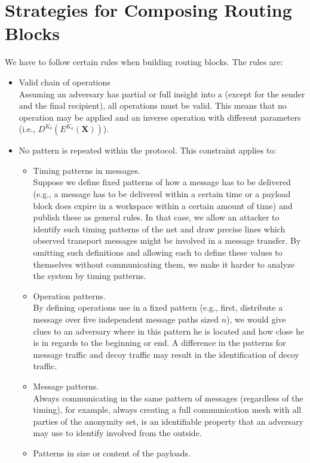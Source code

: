 \section{Strategies for Composing Routing Blocks}\label{sec:routingStrategies}
We have to follow certain rules when building routing blocks. The rules are:
\begin{itemize}
	\item Valid chain of operations\\
	Assuming an adversary has partial or full insight into a  (except for the sender and the final recipient), all operations must be valid. This means that no operation may be applied and an inverse operation with different parameters  (i.e., $D^{K_b}\left(E^{K_a}\left(\textbf{X}\right)\right)$).
	\item No pattern is repeated within the protocol. This constraint applies to:
	\begin{itemize}
		\item Timing patterns in messages.\\
		Suppose we define fixed patterns of how a message has to be delivered (e.g., a message has to be delivered within a certain time or a payload block does expire in a workspace within a certain amount of time) and publish these as general rules. In that case, we allow an attacker to identify such timing patterns of the net and draw precise lines which observed transport messages might be involved in a message transfer. By omitting such definitions and allowing each  to define these values to themselves without communicating them, we make it harder to analyze the system by timing patterns.
		\item Operation patterns.\\
		By defining operations use in a fixed pattern (e.g., first, distribute a message over five independent message paths sized $n$), we would give clues to an adversary where in this pattern he is located and how close he is in regards to the beginning or end. A difference in the patterns for message traffic and decoy traffic may result in the identification of decoy traffic.
		\item Message patterns.\\
		Always communicating in the same pattern of messages (regardless of the timing), for example, always creating a full communication mesh with all parties of the anonymity set, is an identifiable property that an adversary may use to identify involved \VortexNodes{} from the outside.
		\item Patterns in size or content of the payloads.\\

\end{itemize}
\end{itemize}
